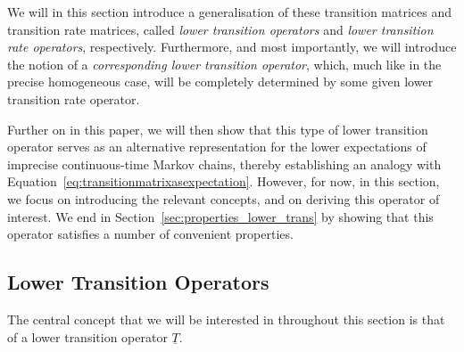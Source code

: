 \documentclass[10pt,a4paper]{paper}
\theoremstyle{definition}
\newcommand{\lt}{\underline{T}}
\begin{document}
We will in this section introduce a generalisation of these transition matrices and transition rate matrices, called \emph{lower transition operators} and \emph{lower transition rate operators}, respectively. Furthermore, and most importantly, we will introduce the notion of a \emph{corresponding lower transition operator}, which, much like in the precise homogeneous case, will be completely determined by some given lower transition rate operator. 

Further on in this paper, we will then  show that this type of lower transition operator serves as an alternative representation for the lower expectations of imprecise continuous-time Markov chains, thereby establishing an analogy with Equation~\eqref{eq:transitionmatrixasexpectation}. However, for now, in this section, we focus on introducing the relevant concepts, and on deriving this operator of interest. We end in Section~\ref{sec:properties_lower_trans} by showing that this operator satisfies a number of convenient properties.

\subsection{Lower Transition Operators}\label{subsec:lowertrans_rate}

The central concept that we will be interested in throughout this section is that of a lower transition operator $\lt$.
\end{document}

